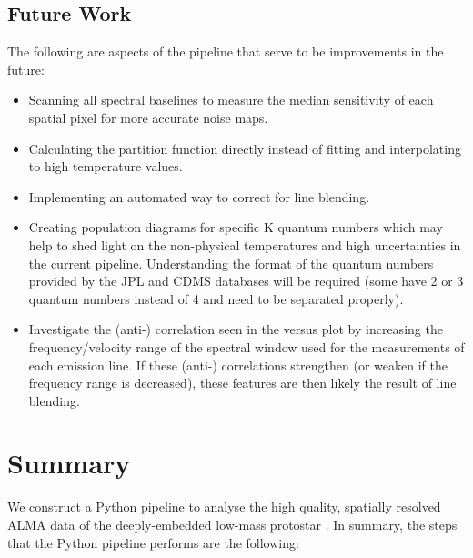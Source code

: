\documentclass[iop,twocolappendix]{emulateapj}
\begin{document}
\subsection{Future Work}

The following are aspects of the pipeline that serve to be improvements in the future:

\begin{itemize}

\item Scanning all spectral baselines to measure the median sensitivity of each spatial pixel for more accurate noise maps.
\item Calculating the partition function directly instead of fitting and interpolating to high temperature values.
\item Implementing an automated way to correct for line blending.
\item Creating population diagrams for specific K quantum numbers which may help to shed light on the non-physical temperatures and high uncertainties in the current pipeline. Understanding the format of the quantum numbers provided by the JPL and CDMS databases will be required (some have 2 or 3 quantum numbers instead of 4 and need to be separated properly).
\item Investigate the (anti-) correlation seen in the {\dispersion} versus {\vLSR} plot by increasing the frequency/velocity range of the spectral window used for the measurements of each emission line. If these (anti-) correlations strengthen (or weaken if the frequency range is decreased), these features are then likely the result of line blending.
\end{itemize}

\section{Summary}
\label{sec:summary}

We construct a Python pipeline to analyse the high quality, spatially resolved ALMA data of the deeply-embedded low-mass protostar {\IRAS}. In summary, the steps that the Python pipeline performs are the following:
\end{document}
